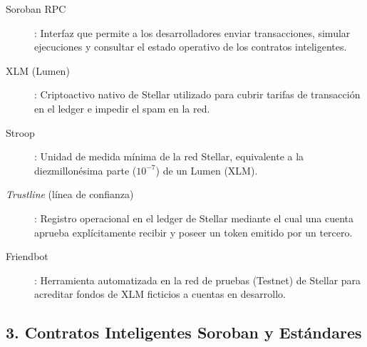 \begin{description}
\item[Soroban RPC]: Interfaz que permite a los desarrolladores enviar transacciones, simular ejecuciones y
consultar el estado operativo de los contratos inteligentes.
\item[XLM (Lumen)]: Criptoactivo nativo de Stellar utilizado para cubrir tarifas de transacción en el ledger
e impedir el spam en la red.
\item[Stroop]: Unidad de medida mínima de la red Stellar, equivalente a la diezmillonésima parte ($10^{-7}$)
de un Lumen (XLM).
\item[\textit{Trustline} (línea de confianza)]: Registro operacional en el ledger de Stellar mediante el cual
una cuenta aprueba explícitamente recibir y poseer un token emitido por un tercero.
\item[Friendbot]: Herramienta automatizada en la red de pruebas (Testnet) de Stellar para acreditar fondos de
XLM ficticios a cuentas en desarrollo.
\end{description}

\subsection*{3. Contratos Inteligentes Soroban y Estándares}

